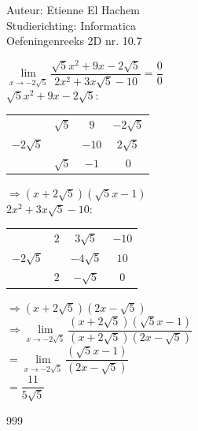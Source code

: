 \documentclass[a4paper]{article}
\begin{document}
  
\noindent \large Auteur: Etienne El Hachem \\
\noindent \large Studierichting: Informatica\\
\noindent \large Oefeningenreeks 2D nr. 10.7\\

\medskip

\normalsize

$\lim\limits_{x\rightarrow -2\sqrt{5}} \dfrac{\sqrt{5}x^2+9x-2\sqrt{5}}{2x^2+3x\sqrt{5}-10} = \dfrac{0}{0}$ \\

$\sqrt{5}x^2+9x-2\sqrt{5}$: \\

\begin{tabular}{c|cc|c}
& $\sqrt{5}$ & $9$ & $-2\sqrt{5}$ \\
$-2\sqrt{5}$ & & $-10$ & $2\sqrt{5}$ \\ \hline
& $\sqrt{5}$ & $-1$ & $0$
\end{tabular}
$\Rightarrow (x+2\sqrt{5})(\sqrt{5}x - 1)$ \\


$2x^2+3x\sqrt{5}-10$: \\

\begin{tabular}{c|cc|c}
& $2$ & $3\sqrt{5}$ & $-10$ \\
$-2\sqrt{5}$ & & $-4\sqrt{5}$ & $10$ \\ \hline
& $2$ & $-\sqrt{5}$ & $0$
\end{tabular}
$\Rightarrow (x + 2\sqrt{5})(2x - \sqrt{5})$ \\


$\Rightarrow \lim\limits_{x\rightarrow -2\sqrt{5}} \dfrac{(x+2\sqrt{5})(\sqrt{5}x - 1)}{(x + 2\sqrt{5})(2x - \sqrt{5})}$ \\

$= \lim\limits_{x\rightarrow -2\sqrt{5}} \dfrac{(\sqrt{5}x - 1)}{(2x - \sqrt{5})}$ \\

$= \dfrac{11}{5\sqrt{5}}$

\begin{thebibliography}{999}
\end{thebibliography}
\end{document}
